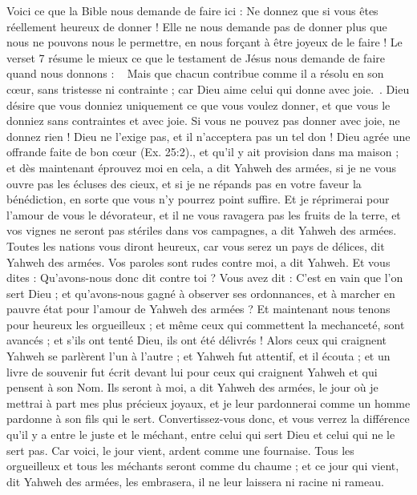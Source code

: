 \begin{multicols}{2}
{Voici ce que la Bible nous demande de faire ici : Ne donnez que si vous êtes réellement heureux de donner ! Elle ne nous demande pas de donner plus que nous ne pouvons nous le permettre, en nous forçant à être joyeux de le faire ! Le verset 7 résume le mieux ce que le testament de Jésus nous demande de faire quand nous donnons : ~ Mais que chacun contribue comme il a résolu en son cœur, sans tristesse ni contrainte ; car Dieu aime celui qui donne avec joie.~. Dieu désire que vous donniez uniquement ce que vous voulez donner, et que vous le donniez sans contraintes et avec joie. Si vous ne pouvez pas donner avec joie, ne donnez rien ! 
Dieu ne l’exige pas, et il n’acceptera pas un tel don ! Dieu agrée une offrande faite de bon cœur (Ex. 25:2).}, et qu'il y ait provision dans ma maison ; et dès maintenant éprouvez moi en cela, a dit Yahweh des armées, si je ne vous ouvre pas les écluses des cieux, et si je ne répands pas en votre faveur la bénédiction, en sorte que vous n'y pourrez point suffire.
Et je réprimerai pour l'amour de vous le dévorateur, et il ne vous ravagera pas les fruits de la terre, et vos vignes ne seront pas stériles dans vos campagnes, a dit Yahweh des armées.
Toutes les nations vous diront heureux, car vous serez un pays de délices, dit Yahweh des armées.
Vos paroles sont rudes contre moi, a dit Yahweh. Et vous dites : Qu'avons-nous donc dit contre toi ?
Vous avez dit : C'est en vain que l’on sert Dieu ; et qu'avons-nous gagné à observer ses ordonnances, et à marcher en pauvre état pour l'amour de Yahweh des armées ?
Et maintenant nous tenons pour heureux les orgueilleux ; et même ceux qui commettent la mechanceté, sont avancés ; et s'ils ont tenté Dieu, ils ont été délivrés !
Alors ceux qui craignent Yahweh se parlèrent l'un à l’autre ; et Yahweh fut attentif, et il écouta ; et un livre de souvenir fut écrit devant lui pour ceux qui craignent Yahweh et qui pensent à son Nom.
Ils seront à moi, a dit Yahweh des armées, le jour où je mettrai à part mes plus précieux joyaux, et je leur pardonnerai comme un homme pardonne à son fils qui le sert.
Convertissez-vous donc, et vous verrez la différence qu'il y a entre le juste et le méchant, entre celui qui sert Dieu et celui qui ne le sert pas.
\VerseOne{}Car voici, le jour vient, ardent comme une fournaise. Tous les orgueilleux et tous les méchants seront comme du chaume ; et ce jour qui vient, dit Yahweh des armées, les embrasera, il ne leur laissera ni racine ni rameau.

\end{multicols}
